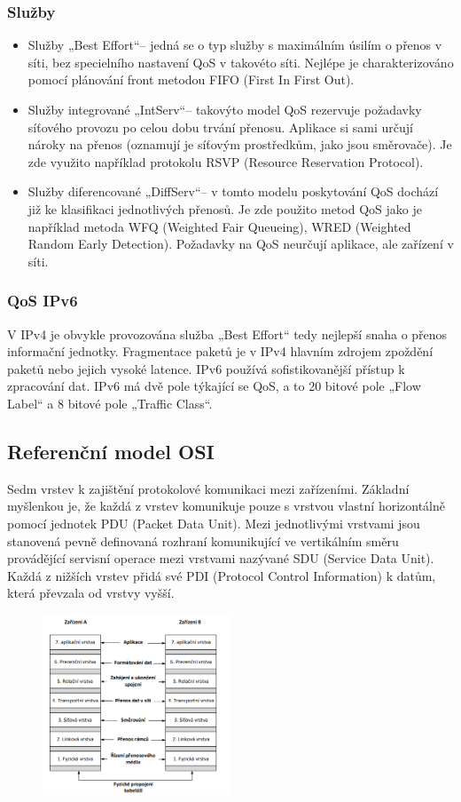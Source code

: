 \subsubsection{Služby}
\begin{itemize}
    \item Služby „Best Effort“– jedná se o typ služby s maximálním úsilím o přenos v síti, bez specielního nastavení QoS v takovéto síti. Nejlépe je charakterizováno pomocí plánování front metodou FIFO (First In First Out).
    \item Služby integrované „IntServ“– takovýto model QoS rezervuje požadavky síťového provozu po celou dobu trvání přenosu. Aplikace si sami určují nároky na přenos (oznamují je síťovým prostředkům, jako jsou směrovače). Je zde využito například protokolu RSVP (Resource Reservation Protocol).
    \item Služby diferencované „DiffServ“– v tomto modelu poskytování QoS dochází již ke klasifikaci jednotlivých přenosů. Je zde použito metod QoS jako je například metoda WFQ (Weighted Fair Queueing), WRED (Weighted Random Early Detection). Požadavky na QoS neurčují aplikace, ale zařízení v síti.
\end{itemize}

\subsubsection{QoS IPv6}
V IPv4 je obvykle provozována služba „Best Effort“ tedy nejlepší snaha o přenos informační jednotky. Fragmentace paketů je v IPv4 hlavním zdrojem zpoždění paketů nebo jejich vysoké latence. IPv6 používá sofistikovanější přístup k zpracování dat. IPv6 má dvě pole týkající se QoS, a to 20 bitové pole „Flow Label“ a 8 bitové pole „Traffic Class“.


\subsection{Referenční model OSI}
Sedm vrstev k zajištění protokolové komunikaci mezi zařízeními. Základní myšlenkou je, že každá z vrstev komunikuje pouze s vrstvou
vlastní horizontálně pomocí jednotek PDU (Packet Data Unit). Mezi jednotlivými vrstvami jsou stanovená pevně definovaná rozhraní
komunikující ve vertikálním směru provádějící servisní operace mezi vrstvami nazývané SDU (Service Data Unit). Každá z nižších vrstev přidá své PDI (Protocol Control Information) k datům, která převzala od vrstvy vyšší. 
\begin{figure} [h]
    \centering
    \includegraphics[width=0.5\textwidth]{snimky/osi.png}
    \label{fig:uml}
\end{figure}

